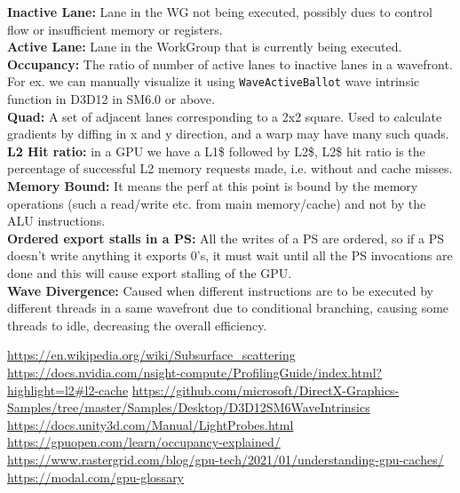 \documentclass[14pt]{article}
\begin{document}
\textbf{Inactive Lane:} Lane in the WG not being executed, possibly dues to control flow or insufficient memory or registers.\cite{wave} \\

\textbf{Active Lane:} Lane in the WorkGroup that is currently being executed.\cite{wave} \\

\textbf{Occupancy:} The ratio of number of active lanes to inactive lanes in a wavefront. For ex. we can manually visualize it using \lstinline|WaveActiveBallot| wave intrinsic function in D3D12 in SM6.0 or above. \\

\textbf{Quad:} A set of adjacent lanes corresponding to a 2x2 square. Used to calculate gradients by diffing in x and y direction, and a warp may have many such quads. \\

\textbf{L2 Hit ratio:} in a GPU we have a L1\$ followed by L2\$, \cite{l2} L2\$ hit ratio is the percentage of successful L2 memory requests made, i.e. without and cache misses. \\

\textbf{Memory Bound:} It means the perf at this point is bound by the memory operations (such a read/write etc. from main memory/cache) and not by the ALU instructions. \\

\textbf{Ordered export stalls in a PS:} All the writes of a PS are ordered, so if a PS doesn't write anything it exports 0's, it must wait until all the PS invocations are done and this will cause export stalling of the GPU. \\

\textbf{Wave Divergence:} Caused when different instructions are to be executed by different threads in a same wavefront due to conditional branching, causing some threads to idle, decreasing the overall efficiency.


\begin{thebibliography}{10}

	 \url{https://en.wikipedia.org/wiki/Subsurface_scattering}
	 \url{https://docs.nvidia.com/nsight-compute/ProfilingGuide/index.html?highlight=l2#l2-cache}
	 \url{https://github.com/microsoft/DirectX-Graphics-Samples/tree/master/Samples/Desktop/D3D12SM6WaveIntrinsics}
	 \url{https://docs.unity3d.com/Manual/LightProbes.html}
	 \url{https://gpuopen.com/learn/occupancy-explained/}
	 \url{https://www.rastergrid.com/blog/gpu-tech/2021/01/understanding-gpu-caches/}
	 \url{https://modal.com/gpu-glossary}
\end{thebibliography}

\end{document}
